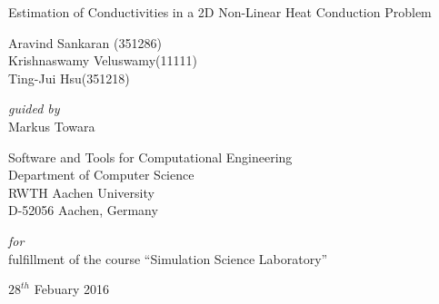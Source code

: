 \documentclass[10pt,a4paper]{report}
\begin{document}
{%
\thispagestyle{empty}
\centering
\Large
{\Large Estimation of Conductivities in a 2D Non-Linear Heat Conduction Problem}


\vspace{0.5cm}



\begin{normalsize}
Aravind Sankaran (351286)\\
Krishnaswamy Veluswamy(11111)\\ 
Ting-Jui Hsu(351218)

\end{normalsize}


\vspace{0.5cm}


\begin{normalsize}
\textit{guided by}\\
Markus Towara

\end{normalsize}

\vspace{0.5cm}


\begin{normalsize}
Software and Tools for Computational Engineering\\ 
Department of Computer Science\\ 
RWTH Aachen University\\ 
D-52056 Aachen, Germany\\

\end{normalsize}

\vspace{0.5cm}


\begin{normalsize}
\textit{for}\\
fulfillment of the course “Simulation Science Laboratory”

\end{normalsize}

\vspace{0.5cm}

{\normalsize $28^{th}$ Febuary 2016}

\vspace{\fill}
\pagebreak 


}
\end{document}
